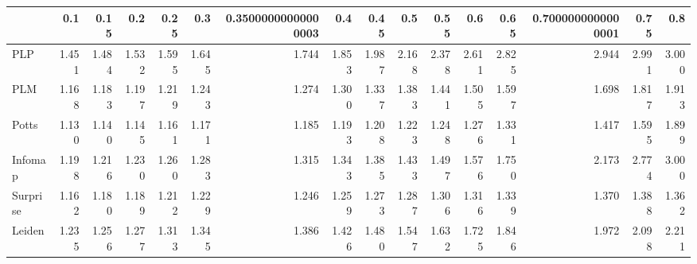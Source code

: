 \begin{tabular}{lrrrrrrrrrrrrrrr}
\toprule
{} &   0.1 &  0.15 &   0.2 &  0.25 &   0.3 & 0.35000000000000003 &   0.4 &  0.45 &   0.5 &  0.55 &   0.6 &  0.65 & 0.7000000000000001 &  0.75 &   0.8 \\
\midrule
PLP      & 1.451 & 1.484 & 1.532 & 1.595 & 1.645 &               1.744 & 1.853 & 1.987 & 2.168 & 2.378 & 2.611 & 2.825 &              2.944 & 2.991 & 3.000 \\
PLM      & 1.168 & 1.183 & 1.197 & 1.219 & 1.243 &               1.274 & 1.300 & 1.337 & 1.383 & 1.441 & 1.505 & 1.597 &              1.698 & 1.817 & 1.913 \\
Potts    & 1.130 & 1.140 & 1.145 & 1.161 & 1.171 &               1.185 & 1.193 & 1.208 & 1.223 & 1.248 & 1.276 & 1.331 &              1.417 & 1.595 & 1.899 \\
Infomap  & 1.198 & 1.216 & 1.230 & 1.260 & 1.283 &               1.315 & 1.343 & 1.385 & 1.433 & 1.497 & 1.576 & 1.750 &              2.173 & 2.774 & 3.000 \\
Surprise & 1.162 & 1.180 & 1.189 & 1.212 & 1.229 &               1.246 & 1.259 & 1.273 & 1.287 & 1.306 & 1.316 & 1.339 &              1.370 & 1.388 & 1.362 \\
Leiden   & 1.235 & 1.256 & 1.277 & 1.313 & 1.345 &               1.386 & 1.426 & 1.480 & 1.547 & 1.632 & 1.725 & 1.846 &              1.972 & 2.098 & 2.211 \\
\bottomrule
\end{tabular}
